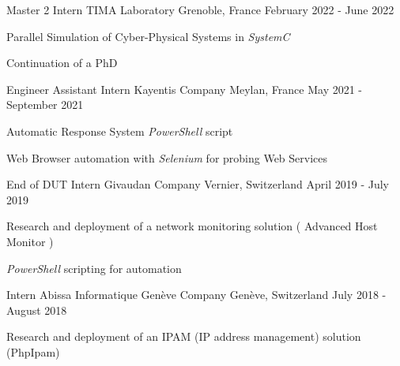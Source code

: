 

\begin{cventries}

  \cventry
    {Master 2 Intern} %
    {TIMA Laboratory} %
    {Grenoble, France} %
    {February 2022 - June 2022} %
    {
      \begin{cvitems} %
        \item{Parallel Simulation of Cyber-Physical Systems in \emph{SystemC}}
        \item{Continuation of a PhD}
      \end{cvitems}
    }

  \cventry
    {Engineer Assistant Intern} %
    {Kayentis Company} %
    {Meylan, France} %
    {May 2021 - September 2021} %
    {
      \begin{cvitems} %
        \item {Automatic Response System \emph{PowerShell} script}
        \item {Web Browser automation with \emph{Selenium} for probing Web Services}
      \end{cvitems}
    }

  \cventry
    {End of DUT Intern} %
    {Givaudan Company} %
    {Vernier, Switzerland} %
    {April 2019 - July 2019} %
    {
      \begin{cvitems} %
        \item {Research and deployment of a network monitoring solution ( Advanced Host Monitor )}
        \item {\emph{PowerShell} scripting for automation}
      \end{cvitems}
    }
  
    \cventry
    {Intern} %
    {Abissa Informatique Genève Company} %
    {Genève, Switzerland} %
    {July 2018 - August 2018} %
    {
      \begin{cvitems} %
        \item {Research and deployment of an IPAM (IP address management) solution (PhpIpam)}
      \end{cvitems}
    }
\end{cventries}
